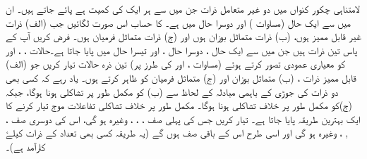 لامتناہی چکور کنواں میں دو  غیر متعامل ذرات جن میں سے ہر ایک کی کمیت   ہے پائے جاتے ہیں۔ ان میں سے ایک حال   (مساوات )   اور دوسرا حال     میں ہے۔  کا حساب اس صورت لگائیں  جب (الف)  ذرات  غیر قابل ممیز ہوں،  (ب) ذرات  متماثل بوزان ہوں اور (ج)  ذرات متماثل فرمیان ہوں۔
فرض کریں آپ کے پاس تین ذرات ہیں جن میں سے ایک حال ،  دوسرا حال ،  اور تیسرا حال  میں پایا  جاتا  ہے۔حالات  ، ،  اور  کو معیاری عمودی تصور کرتے  ہوئے   (مساوات  ،   اور   کی طرز پر)  تین  ذرہ حالات تیار کریں جو (الف) قابل ممیز ذرات ،  (ب) متماثل بوزان اور (ج) متماثل فرمیان کو ظاہر کرتے ہوں۔ یاد رہے کہ کسی بھی دو ذرات کی جوڑی کے باہمی مبادلہ کے لحاظ سے (ب) کو مکمل طور پر تشاکلی ہونا ہوگا،  جبکہ (ج)کو مکمل طور پر خلاف تشاکلی ہونا ہوگا۔   مکمل طور پر خلاف تشاکلی تفاعلات موج تیار کرنے کا ایک بہترین طریقہ پایا جاتا ہے۔   تیار کریں جس کی پہلی صف   ،  ، ،  وغیرہ  ہو گی،  اس کی دوسری صف  ،  , ، وغیرہ ہو گی اور اسی طرح اس کے باقی صف ہوں گے (یہ طریقہ  کسی بھی تعداد کے ذرات کیلۓ کارآمد ہے)۔

